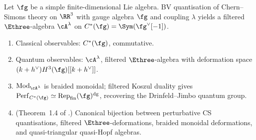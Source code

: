 \begin{theorem}
\label{thm:cfg}
\ClaimStatusProvedElsewhere
Let $\fg$ be a simple finite-dimensional Lie algebra.
BV quantisation of Chern--Simons theory on $\RR^3$ with
gauge algebra $\fg$ and coupling $\lambda$ yields
a filtered $\Ethree$-algebra $\cA^\lambda$ on
$C^*(\fg) = \Sym(\fg^\vee[-1])$.
\begin{enumerate}[label=\textup{(\roman*)}]
\item Classical observables: $C^*(\fg)$, commutative.
\item Quantum observables: $\cA^\lambda$, filtered
 $\Ethree$-algebra with deformation space
 $(k+h^\vee) H^3(\fg)[[k+h^\vee]]$.
\item $\mathrm{Mod}_{\cA^\lambda}$ is braided monoidal;
 filtered Koszul duality gives
 $\mathrm{Perf}_{C^*(\fg)} \simeq
 \mathrm{Rep}_{\mathrm{fin}}(\fg)^{\mathrm{dg}}$,
 recovering the Drinfeld--Jimbo quantum group.
\item \textup{(Theorem~1.4 of \cite{CFG25}.)} Canonical
 bijection between perturbative CS quantisations,
 filtered $\Ethree$-deformations, braided monoidal
 deformations, and quasi-triangular quasi-Hopf algebras.
\end{enumerate}
\end{theorem}

